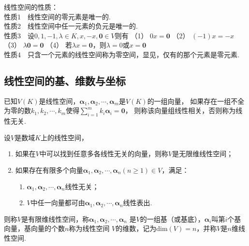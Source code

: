     \begin{theorem}
        线性空间的性质：\\
        {\heiti 性质1}$\quad$线性空间的零元素是唯一的.\\
        {\heiti 性质2}$\quad$线性空间中任一元素的负元是唯一的.\\
        {\heiti 性质3}$\quad$设$0,1,-1,\lambda\in K,x,-x,\boldsymbol{0}\in V$则有
            （1） $0x=\boldsymbol{0}$
            （2） $(-1)x=-x$
            （3） $\lambda\boldsymbol{0}=\boldsymbol{0}$
            （4） 若$\lambda x=\boldsymbol{0}$，则$\lambda=0$或$x=\boldsymbol{0}$\\
        {\heiti 性质4}$\quad$只含一个元素的线性空间称为{\heiti 零空间}，显见，仅有的那个元素是零元素.
    \end{theorem}

\subsection{线性空间的基、维数与坐标}
    \begin{definition}[线性相关与线性无关]
        已知$V(K)$是线性空间，$\boldsymbol{\alpha}_1,\boldsymbol{\alpha}_2,\cdots,\boldsymbol{\alpha}_m$是$V(K)$的一组向量，
        如果存在一组不全为零的数$k_1,k_2,\cdots,k_m$使得$\displaystyle{\sum_{i=1}^m k_i\boldsymbol{\alpha}_i=\boldsymbol{0}}$，
        则称该向量组{\heiti 线性相关}，否则称为{\heiti 线性无关}.
    \end{definition}

    \begin{definition}[维数]
        设$V$是数域$K$上的线性空间，
        \begin{enumerate}[(1)]
            \item 如果在$V$中可以找到任意多各线性无关的向量，则称$V$是{\heiti 无限维线性空间}；
            \item 如果存在有限多个向量$\boldsymbol{\alpha}_1,\boldsymbol{\alpha}_2,\cdots,\boldsymbol{\alpha}_n(n\geq 1)\in V$，满足：
            \begin{enumerate}[1)]
                \item $\boldsymbol{\alpha}_1,\boldsymbol{\alpha}_2,\cdots,\boldsymbol{\alpha}_n$线性无关；
                \item $V$中任一向量都可由$\boldsymbol{\alpha}_1,\boldsymbol{\alpha}_2,\cdots,\boldsymbol{\alpha}_n$线性表出.
            \end{enumerate}
        \end{enumerate}
        则称$V$是{\heiti 有限维线性空间}，称$\boldsymbol{\alpha}_1,\boldsymbol{\alpha}_2,\cdots,\boldsymbol{\alpha}_n$
        是$V$的一组{\heiti 基}（或{\heiti 基底}），$\boldsymbol{\alpha}_i$叫第$i$个{\heiti 基向量}，基向量的个数$n$称为线性空间
        $V$的{\heiti 维数}，记为$\mathrm{dim}(V)=n$，并称$V$是$n$维线性空间.
    \end{definition}

